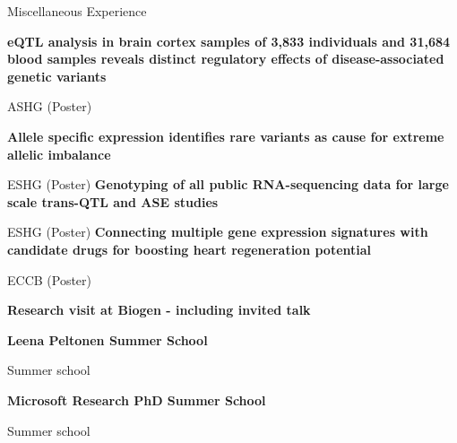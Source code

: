 \begin{rubric}{Miscellaneous Experience}



\entry*[17 October 2019] \textbf{eQTL analysis in brain cortex samples of 3,833 individuals and 31,684 blood samples reveals distinct regulatory effects of disease-associated genetic variants} \par
ASHG (Poster)

\entry*[17 June 2018] \textbf{Allele specific expression identifies rare variants as cause for extreme allelic imbalance} \par
ESHG (Poster)
%
\entry*[25 May 2016] \textbf{Genotyping of all public RNA-sequencing data for large scale trans-QTL and ASE studies} \par
ESHG (Poster)
%
\entry*[8 Sep 2014] \textbf{Connecting multiple gene expression signatures with candidate drugs for boosting heart regeneration potential} \par
ECCB (Poster)


 \textbf{Research visit at Biogen - including invited talk} \par


\entry*[Aug 2018] \textbf{Leena Peltonen Summer School} \par
Summer school

\entry*[Jul 2016] \textbf{Microsoft Research PhD Summer School} \par
Summer school

\end{rubric}